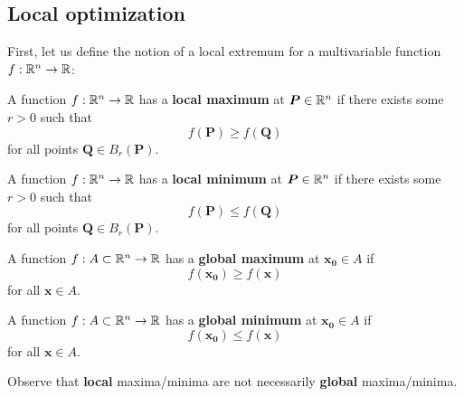 \subsection{Local optimization}

First, let us define the notion of a local extremum for a multivariable function $f: \mathbb{R}^n \to \mathbb{R}$:

\begin{definition}
    A function $f: \mathbb{R}^n \to \mathbb{R}$ has a \textbf{local maximum} at $\bm{P} \in \mathbb{R}^n$ if there exists some $r>0$ such that
    $$f(\bm{P}) \geq f(\bm{Q})$$
    for all points $\bm{Q} \in B_r(\bm{P})$.
    \end{definition}

    \begin{definition}
    A function $f: \mathbb{R}^n \to \mathbb{R}$ has a \textbf{local minimum} at $\bm{P} \in \mathbb{R}^n$ if there exists some $r>0$ such that
    $$f(\bm{P}) \leq f(\bm{Q})$$
    for all points $\bm{Q} \in B_r(\bm{P})$.
    \end{definition}


\begin{definition}
    A function $f : A \subset \mathbb{R}^n \to \mathbb{R}$ has a \textbf{global maximum} at $\bm{x_0} \in A$ if
    $$f(\bm{x_0}) \geq f(\bm{x})$$ 
    for all $\bm{x} \in A$.
    \end{definition}
    
    \begin{definition}
    A function $f : A \subset \mathbb{R}^n \to \mathbb{R}$ has a \textbf{global minimum} at $\bm{x_0} \in A$ if
    $$f(\bm{x_0}) \leq f(\bm{x})$$ 
    for all $\bm{x} \in A$.
    \end{definition}

\begin{remark}
    Observe that \textbf{local} maxima/minima are not necessarily \textbf{global} maxima/minima.
    \end{remark}
    
    \begin{center}
    \end{center}


